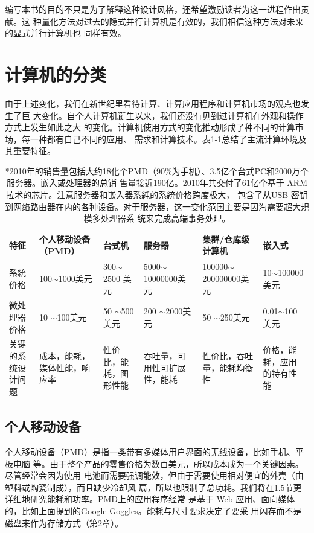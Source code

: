 编写本书的目的不只是为了解释这种设计风格，还希望激励读者为这一进程作出贡献。这
种量化方法对过去的隐式并行计算机是有效的，我们相信这种方法对未来的显式并行计算机也
同样有效。

\section{计算机的分类}
由于上述变化，我们在新世纪里看待计算、计算应用程序和计算机市场的观点也发生了巨
大变化。自个人计算机诞生以来，我们还没有见到过计算机在外观和操作方式上发生如此之大
的变化。计算机使用方式的变化推动形成了种不同的计算市场，每一种都有自己不同的应用、
需求和计算技术。表1-1总结了主流计算环境及其重要特征。
\begin{table}[]
    \scriptsize
    \centering
    \begin{tabular}{C{0.09\textwidth}|C{0.15\textwidth}|C{0.15\textwidth}|C{0.15\textwidth}|C{0.15\textwidth}|C{0.15\textwidth}}
        \hline
        特征    & 个人移动设备（PMD）    & 台式机   & 服务器     & 集群/仓库级计算机   & 嵌入式     \\ \hline
        系統价格  & 100$\sim$1000美元     & 300$\sim$2500 美元     & 5000$\sim$10000000美元 & 100000$\sim$200000000美元 & 10$\sim$100000美元   \\ \hline
        微处理器价格    & 10 $\sim$100美元    & 50 $\sim$500美元    & 200 $\sim$2000美元     & 50 $\sim$250美元     & 0.01$\sim$100美元   \\ \hline
        关键的系统设计问题 & 成本，能耗，媒体性能，响应率 & 性价比，能耗，图形性能 & 吞吐量，可用性可扩展性，能耗      & 性价比，吞吐量，能耗均衡性  & 价格，能耗，应用的特有性能 \\ \hline
    \end{tabular}
    \caption{*2010年的销售量包括大约18化个PMD（90\%为手机）、3.5亿个台式PC和2000万个服务器。嵌入或处理器的总销
        售量接近190亿。2010年共交付了61亿个基于 ARM拉术的芯片。注意服务器和嵌入器系純的系統价格跨度极大，
        包含了从USB 密钥到网络路由器在内的各种设备。对于服务器，这一变化范国主要是因汋需要超大規模多处理器系
        统来完成高端事务处理。}
\end{table}

\subsection{个人移动设备}
个人移动设备（PMD）是指一类带有多媒体用户界面的无线设备，比如手机、平板电脑
等。由于整个产品的零售价格为数百美元，所以成本成为一个关键因素。尽管经常会因为使用
电池而需要强调能效，但由于需要使用相对便宜的外壳（由塑料或陶瓷制成），而且缺少冷却风
扇，所以也限制了总功耗。我们将在1.5节更详细地研究能耗和功率。PMD上的应用程序经常
是基于 Web 应用、面向媒体的，比如上面提到的Google Goggles。能耗与尺寸要求决定了要采
用闪存而不是磁盘来作为存储方式（第2章）。

